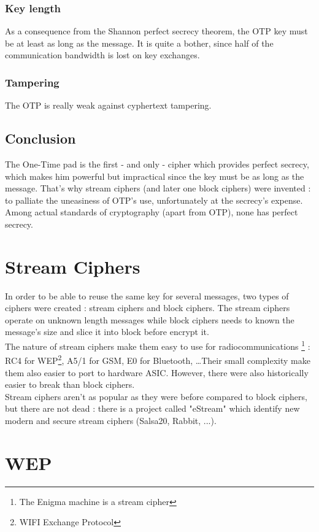 \subsubsection{Key length}
As a consequence from the Shannon perfect secrecy theorem, the OTP key must be at least as long as the message. It is quite a bother, since half of the communication bandwidth is lost on key exchanges.

\subsubsection{Tampering}
The OTP is really weak against cyphertext tampering.

\subsection{Conclusion}

The One-Time pad is the first - and only - cipher which provides perfect secrecy, which makes him powerful but impractical since the key must be as long as the message. That's why stream ciphers (and later one block ciphers) were invented : to palliate the uneasiness of OTP's use, unfortunately at the secrecy's expense. Among actual standards of cryptography (apart from OTP), none has perfect secrecy. 

\section{ Stream Ciphers }

In order to be able to reuse the same key for several messages, two types of ciphers were created : stream ciphers and block ciphers. The stream ciphers operate on unknown length messages while block ciphers needs to known the message's size and slice it into block before encrypt it.\\
The nature of stream ciphers make them easy to use for radiocommunications \footnote{The Enigma machine is a stream cipher} : RC4 for WEP\footnote{WIFI Exchange Protocol}, A5/1 for GSM, E0 for Bluetooth, \dots Their small complexity make them also easier to port to hardware ASIC. However, there were also historically easier to break than block ciphers.\\
Stream ciphers aren't as popular as they were before compared to block ciphers, but there are not dead : there is a project called "eStream" which identify new modern and secure stream ciphers (Salsa20, Rabbit, ...). 

\section{WEP}
\label{sec:WEP}

